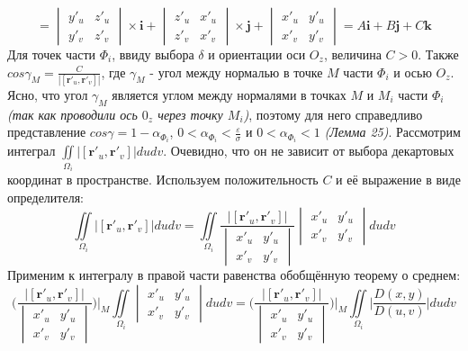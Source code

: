 \documentclass[12pt,a4paper]{article}
\begin{document}
	\begin{equation}\label{CoordVec} = 
	\begin{vmatrix}
		y'_{u} & z'_{u}\\
		y'_{v} & z'_{v}
	\end{vmatrix} \times \textbf{i} +
	\begin{vmatrix}
		z'_{u} & x'_{u}\\
		z'_{v} & x'_{v}
	\end{vmatrix} \times \textbf{j} +	
	\begin{vmatrix}
		x'_{u} & y'_{u}\\
		x'_{v} & y'_{v}
	\end{vmatrix} = A\textbf{i} + B\textbf{j} + C\textbf{k}
	\end{equation}
	\newline
	Для точек части $\Phi_{i}$, ввиду выбора $\delta$ и ориентации оси $O_{z}$, величина $C > 0$. Также $cos\gamma_{M} = \frac{C}{|\left[ \textbf{r}'_{u}, \textbf{r}'_{v} \right]|}$, где $\gamma_{M}$ - угол между нормалью в точке $M$ части $\Phi_{i}$ и осью $O_{z}$.
	\newline
	Ясно, что угол $\gamma_{M}$ является углом между нормалями в точках $M$ и $M_{i}$ части $\Phi_{i}$ \textit{(так как проводили ось $0_{z}$ через точку $M_{i}$)}, поэтому для него справедливо представление $cos\gamma = 1 - \alpha_{\Phi_{i}}$, $0 < \alpha_{\Phi_{i}} < \frac{\varepsilon}{\sigma}$ и $0 < \alpha_{\Phi_{i}} < 1$ \textit{(Лемма 25)}.
	\newline
	\newline
	Рассмотрим интеграл $\iint\limits_{\Omega_{i}} | \left[ \textbf{r}'_{u}, \textbf{r}'_{v} \right] | dudv$. Очевидно, что он не зависит от выбора декартовых координат в пространстве. Используем положительность $C$ и её выражение в виде определителя:
	\[\iint\limits_{\Omega_{i}} | \left[ \textbf{r}'_{u}, \textbf{r}'_{v} \right] | dudv = \iint\limits_{\Omega_{i}} \frac{| \left[ \textbf{r}'_{u}, \textbf{r}'_{v} \right] |}{
		\begin{vmatrix}
			x'_{u} & y'_{u}\\
			x'_{v} & y'_{v}
		\end{vmatrix}
	}
	\begin{vmatrix}
		x'_{u} & y'_{u}\\
		x'_{v} & y'_{v}
	\end{vmatrix} dudv\]
	Применим к интегралу в правой части равенства обобщённую теорему о среднем:
	\[ \bigg(\frac{| \left[ \textbf{r}'_{u}, \textbf{r}'_{v} \right] |}{
		\begin{vmatrix}
			x'_{u} & y'_{u}\\
			x'_{v} & y'_{v}
		\end{vmatrix}
	}\bigg)\bigg|_M
	\iint\limits_{\Omega_{i}} 
		\begin{vmatrix}
			x'_{u} & y'_{u}\\
			x'_{v} & y'_{v}
		\end{vmatrix} dudv
	=
	\bigg(\frac{| \left[ \textbf{r}'_{u}, \textbf{r}'_{v} \right] |}{
		\begin{vmatrix}
			x'_{u} & y'_{u}\\
			x'_{v} & y'_{v}
		\end{vmatrix}
	}\bigg)\bigg|_M
	\iint\limits_{\Omega_{i}} \bigg| \frac{D(x,y)}{D(u,v)} \bigg| dudv	
	\]
\end{document}

